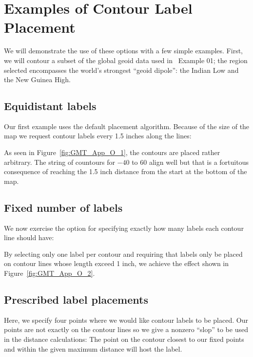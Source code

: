 \section{Examples of Contour Label Placement}

We will demonstrate the use of these options with a few simple examples.
First, we will contour a subset of the global geoid data used in \GMT\ Example 01;
the region selected encompasses the world's strongest ``geoid dipole'': the Indian Low
and the New Guinea High.

\subsection{Equidistant labels}

Our first example uses the default placement algorithm.  Because of the size
of the map we request contour labels every 1.5 inches along the lines:


\noindent
As seen in Figure~\ref{fig:GMT_App_O_1}, the contours are placed rather arbitrary.
The string of countours for $-40$ to $60$ align well but that is a fortuitous 
consequence of reaching the 1.5 inch distance from the start at the bottom of the map.


\subsection{Fixed number of labels}

We now exercise the option for specifying exactly how many labels each contour line
should have:


\noindent
By selecting only one label per contour and requiring that labels only be placed on
contour lines whose length exceed 1 inch, we achieve the effect shown in Figure~\ref{fig:GMT_App_O_2}.


\subsection{Prescribed label placements}

Here, we specify four points where we would like contour labels to be placed.  Our points
are not exactly on the contour lines so we give a nonzero ``slop'' to be used in the
distance calculations: The point on the contour closest to our fixed points and within
the given maximum distance will host the label.

